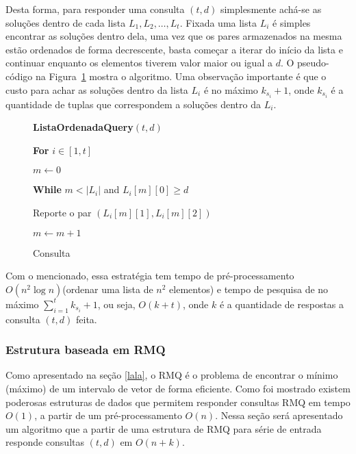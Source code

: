 \documentclass[12pt]{article}
\begin{document}
Desta forma, para responder uma consulta $(t, d)$ simplesmente achá-se as soluções
dentro de cada lista $L_1, L_2, \ldots, L_t$. Fixada uma lista $L_i$ é simples
encontrar as soluções dentro dela, uma vez que os pares armazenados na mesma
estão ordenados de forma decrescente, basta começar a iterar do início
da lista e continuar enquanto os elementos tiverem valor maior ou igual a	$d$.
O pseudo-código na Figura~\ref{fig:listaquery} mostra o algoritmo. Uma observação importante é 
que o custo para achar as soluções dentro da lista $L_i$ é no máximo $k_{s_i} + 1$,
 onde $k_{s_i}$ é a quantidade de tuplas que correspondem a soluções dentro da $L_i$. 

\bigskip
\begin{center}
\begin{figure}
\begin{framed}
{\bf ListaOrdenadaQuery}$(t, d)$

\hspace{1cm} {\bf For} $i \in [1, t]$

\hspace{2cm} $m \leftarrow 0$

\hspace{2cm} {\bf While} $m < |L_i|$ and $L_i[m][0] \ge d$

\hspace{3cm} Reporte o par $(L_i[m][1], L_i[m][2])$

\hspace{3cm} $m \leftarrow m + 1$
\caption{Consulta}
\label{fig:listaquery}
\end{framed}
\end{figure}
\end{center}

Com o mencionado, essa estratégia tem tempo de pré-processamento $O(n^2 \log n)$(ordenar uma lista de $n^2$ elementos) 
e tempo de pesquisa de no máximo $\sum_{i = 1}^{t} k_{s_i} + 1$, ou seja, $O(k + t)$,
onde $k$ é a quantidade de respostas a consulta $(t,d)$ feita.

\subsubsection{Estrutura baseada em RMQ}

Como apresentado na seção \ref{lala}, o RMQ é o problema de 
encontrar o mínimo (máximo) de um intervalo de vetor de forma 
eficiente. Como foi mostrado existem poderosas estruturas
de dados que permitem responder consultas RMQ em tempo $O(1)$, a partir de um pré-processamento $O(n)$. 
Nessa seção será apresentado um algoritmo que a partir de uma estrutura de RMQ para série
de entrada responde consultas $(t, d)$ em $O(n + k)$. 
\end{document}
